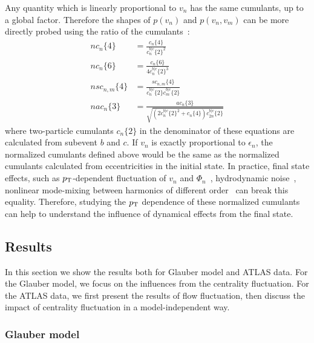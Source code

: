 Any quantity which is linearly proportional to $v_n$ has the same cumulants, up to a global factor. Therefore the shapes of $p(v_n)$ and $p(v_n, v_m)$ can be more directly probed using the ratio of the cumulants~\cite{Giacalone:2016afq, Das:2017ned}:
\begin{equation}
\begin{split}
nc_n\{4\} &= \frac{c_n\{4\}}{c_n^{b|c}\{2\}^2} \\
nc_n\{6\} &= \frac{c_n\{6\}}{4 c_n^{b|c}\{2\}^3} \\
nsc_{n,m}\{4\} &= \frac{sc_{n,m}\{4\}}{c_n^{b|c}\{2\} c_m^{b|c}\{2\}} \\
nac_n\{3\} &= \frac{ac_n\{3\}}{\sqrt{(2c_n^{b|c}\{2\}^2 + c_n\{4\}) c_{2n}^{b|c}\{2\}}}
\end{split}
\end{equation}
where two-particle cumulants $c_n\{2\}$ in the denominator of these equations are calculated from subevent $b$ and $c$. If $v_n$ is exactly proportional to $\epsilon_n$, the normalized cumulants defined above would be the same as the normalized cumulants calculated from eccentricities in the initial state. In practice, final state effects, such as $p_\text{T}$-dependent fluctuation of $v_n$ and $\Phi_n$~\cite{Gardim:2012im, Heinz:2013bua}, hydrodynamic noise~\cite{Akamatsu:2016llw}, nonlinear mode-mixing between harmonics of different order~\cite{Gardim:2011xv, Teaney:2012ke} can break this equality. Therefore, studying the $p_\text{T}$ dependence of these normalized cumulants can help to understand the influence of dynamical effects from the final state.



\subsection{Results}

In this section we show the results both for Glauber model and ATLAS data. For the Glauber model, we focus on the influences from the centrality fluctuation. For the ATLAS data, we first present the results of flow fluctuation, then discuss the impact of centrality fluctuation in a model-independent way.

\subsubsection{Glauber model}
\label{sec:glauber_model}

